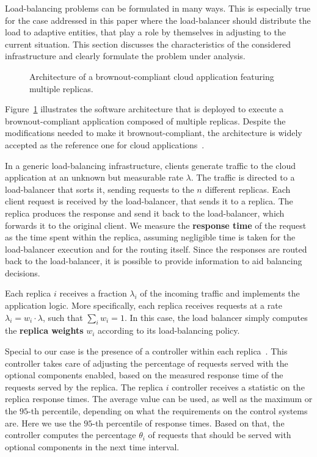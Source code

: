 Load-balancing problems can be formulated in many ways. This is
especially true for the case addressed in this paper where the
load-balancer should distribute the load to adaptive entities, that
play a role by themselves in adjusting to the current situation. This
section discusses the characteristics of the considered infrastructure
and clearly formulate the problem under analysis.

\begin{figure}[t]
  \centering 
   
  \caption{Architecture of a brownout-compliant cloud application
    featuring multiple replicas.}
    \vspace{-6mm}
  \label{fig:architecture}
\end{figure}

Figure~\ref{fig:architecture} illustrates the software architecture
that is deployed to execute a brownout-compliant application composed
of multiple replicas. Despite the modifications needed to make it
brownout-compliant, the architecture is widely accepted as the
reference one for cloud applications~\citep{Barroso09}.

In a generic load-balancing infrastructure, clients generate traffic
to the cloud application at an unknown but measurable rate
$\lambda$. The traffic is directed to a load-balancer that sorts it,
sending requests to the $n$ different replicas. Each client request is
received by the load-balancer, that sends it to a replica. The replica
produces the response and send it back to the load-balancer, which
forwards it to the original client. We measure the \textbf{response
  time} of the request as the time spent within the replica, assuming
negligible time is taken for the load-balancer execution and for the
routing itself. Since the responses are routed back to the
load-balancer, it is possible to provide information to aid balancing
decisions.

Each replica $i$ receives a fraction $\lambda_i$ of the incoming
traffic and implements the application logic. More specifically, each
replica receives requests at a rate $\lambda_i = w_i \cdot \lambda$,
such that $\sum_{i} w_i = 1$. In this case, the load balancer simply
computes the \textbf{replica weights} $w_i$ according to its
load-balancing policy.

Special to our case is the presence of a controller within each
replica~\cite{cloudish-tr}. This controller takes care of adjusting
the percentage of requests served with the optional components
enabled, based on the measured response time of the requests served by
the replica. The replica $i$ controller receives a statistic on the
replica response times. The average value can be used, as well as the
maximum or the $95$-th percentile, depending on what the requirements
on the control systems are. Here we use the $95$-th percentile of
response times. Based on that, the controller computes the percentage
$\theta_i$ of requests that should be served with optional components
in the next time interval.

